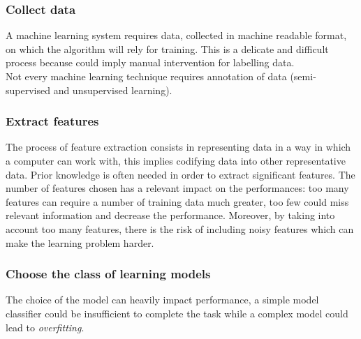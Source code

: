     \subsubsection*{Collect data}
        A machine learning system requires data, collected in machine readable format, on which the algorithm will rely for training. This is a delicate and difficult process because could imply manual intervention for labelling data.\\
        Not every machine learning technique requires annotation of data (semi-supervised and unsupervised learning).
        
    \subsubsection*{Extract features}
        The process of feature extraction consists in representing data in a way in which a computer can work with, this implies codifying data into other representative data.
        Prior knowledge is often needed in order to extract significant features. The number of features chosen has a relevant impact on the performances: too many features can require a number of training data much greater, too few could miss relevant information and decrease the performance. Moreover, by taking into account too many features, there is the risk of including noisy features which can make the learning problem harder.
    
    \subsubsection*{Choose the class of learning models}
        The choice of the model can heavily impact performance, a simple model classifier could be insufficient to complete the task while a complex model could lead to \textit{overfitting}. 
        
